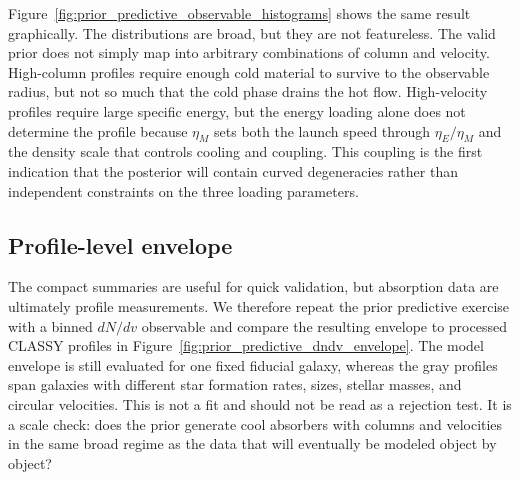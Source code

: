 Figure~\ref{fig:prior_predictive_observable_histograms} shows the same result
graphically.  The distributions are broad, but they are not featureless.  The
valid prior does not simply map into arbitrary combinations of column and
velocity.  High-column profiles require enough cold material to survive to the
observable radius, but not so much that the cold phase drains the hot flow.
High-velocity profiles require large specific energy, but the energy loading
alone does not determine the profile because $\eta_M$ sets both the launch speed
through $\eta_E/\eta_M$ and the density scale that controls cooling and
coupling.  This coupling is the first indication that the posterior will contain
curved degeneracies rather than independent constraints on the three loading
parameters.

\subsection{Profile-level envelope}
\label{subsec:prior_predictive_dndv}

The compact summaries are useful for quick validation, but absorption data are
ultimately profile measurements.  We therefore repeat the prior predictive
exercise with a binned $dN/dv$ observable and compare the resulting envelope to
processed CLASSY profiles in Figure~\ref{fig:prior_predictive_dndv_envelope}.
The model envelope is still evaluated for one fixed fiducial galaxy, whereas
the gray profiles span galaxies with different star formation rates, sizes,
stellar masses, and circular velocities.  This is not a fit and should not be
read as a rejection test.  It is a scale check: does the prior generate cool
absorbers with columns and velocities in the same broad regime as the data that
will eventually be modeled object by object?

